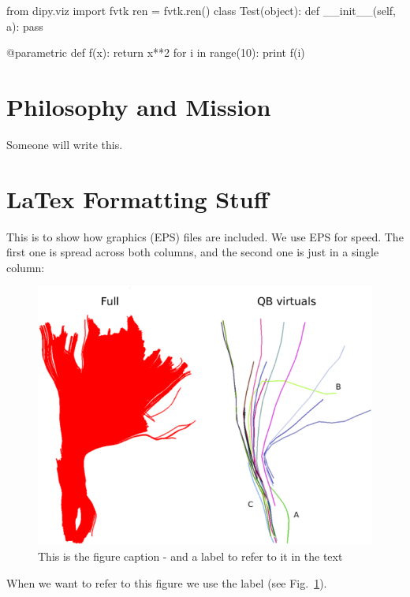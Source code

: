 \documentclass{bioinfo}
\begin{document}
\begin{python}
from dipy.viz import fvtk
ren = fvtk.ren()
class Test(object):
  def __init__(self, a):
    pass

@parametric
def f(x):
  return x**2
for i in range(10):
  print f(i)
\end{python}


\section{Philosophy and Mission}

Someone will write this.

\section{LaTex Formatting Stuff}

This is to show how graphics (EPS) files are included. We use EPS for
speed. The first one is spread across both columns, and the second one
is just in a single column:

\begin{figure}
\centerline{\includegraphics[width=160mm]{Figures/Fig_4_cst_simplification_relabeled_triple.eps}}
\caption{This is the figure caption - and a label to refer to it in the text \label{Fig:big_picture}}
\end{figure}

When we want to refer to this figure we use the label (see
Fig.~\ref{Fig:big_picture}).
\end{document}
